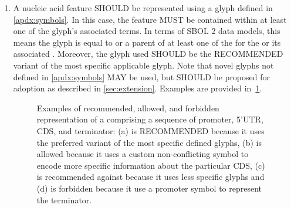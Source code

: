 \begin{enumerate}
\item A nucleic acid feature SHOULD be represented using a glyph defined in \ref{apdx:symbols}.  In this case, the feature MUST be contained within at least one of the glyph's associated terms.
In terms of SBOL 2 data models, this means the glyph is equal to or a parent of at least one of the  for the  or its associated .
	Moreover, the glyph used SHOULD be the RECOMMENDED variant of the most specific applicable glyph.  Note that novel glyphs not defined in \ref{apdx:symbols} MAY be used, but SHOULD be proposed for adoption as described in \ref{sec:extension}.
	Examples are provided in~\ref{exa:2f}.
	\begin{figure}[h!]
	\centering
	\caption{Examples of recommended, allowed, and forbidden representation of a  comprising a sequence of promoter, 5'UTR, CDS, and terminator: (a) is RECOMMENDED because it uses the preferred variant of the most specific defined glyphs, (b) is allowed because it uses a custom non-conflicting symbol to encode more specific information about the particular CDS, (c) is recommended against because it uses less specific glyphs and (d) is forbidden because it use a promoter symbol to represent the terminator.}
	\label{exa:2f}
	\end{figure}
\end{enumerate}
	
